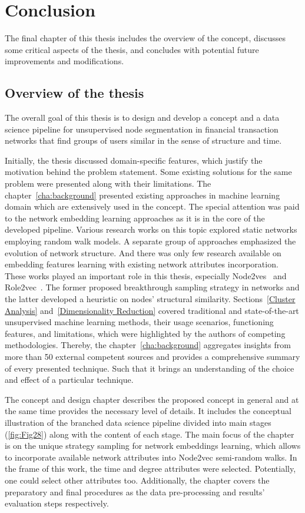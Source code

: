\chapter{Conclusion}
\label{cha:conclusion}

The final chapter of this thesis includes the overview of the concept, discusses some critical aspects of the thesis, and concludes with potential future improvements and modifications.

\section{Overview of the thesis}

The overall goal of this thesis is to design and develop a concept and a data science pipeline for unsupervised node segmentation in financial transaction networks that find groups of users similar in the sense of structure and time.

Initially, the thesis discussed domain-specific features, which justify the motivation behind the problem statement. Some existing solutions for the same problem were presented along with their limitations. The chapter~\ref{cha:background} presented existing approaches in machine learning domain which are extensively used in the concept. The special attention was paid to the network embedding learning approaches as it is in the core of the developed pipeline. Various research works on this topic explored static networks employing random walk models. A separate group of approaches emphasized the evolution of network structure. And there was only few research available on embedding features learning with existing network attributes incorporation. These works played an important role in this thesis, especially Node2ves~\cite{node2vec} and Role2vec~\cite{role2vec}. The former proposed breakthrough sampling strategy in networks and the latter developed a heuristic on nodes' structural similarity. Sections~\ref{Cluster Analysis} and~\ref{Dimensionality Reduction} covered traditional and state-of-the-art unsupervised machine learning methods, their usage scenarios, functioning features, and limitations, which were highlighted by the authors of competing methodologies. Thereby, the chapter~\ref{cha:background} aggregates insights from more than 50 external competent sources and provides a comprehensive summary of every presented technique. Such that it brings an understanding of the choice and effect of a particular technique.

The concept and design chapter describes the proposed concept in general and at the same time provides the necessary level of details. It includes the conceptual illustration of the branched data science pipeline divided into main stages (\autoref{fig:Fig28}) along with the content of each stage. The main focus of the chapter is on the unique strategy sampling for network embeddings learning, which allows to incorporate available network attributes into Node2vec semi-random walks. In the frame of this work, the time and degree attributes were selected. Potentially, one could select other attributes too. Additionally, the chapter covers the preparatory and final procedures as the data pre-processing and results' evaluation steps respectively. 

